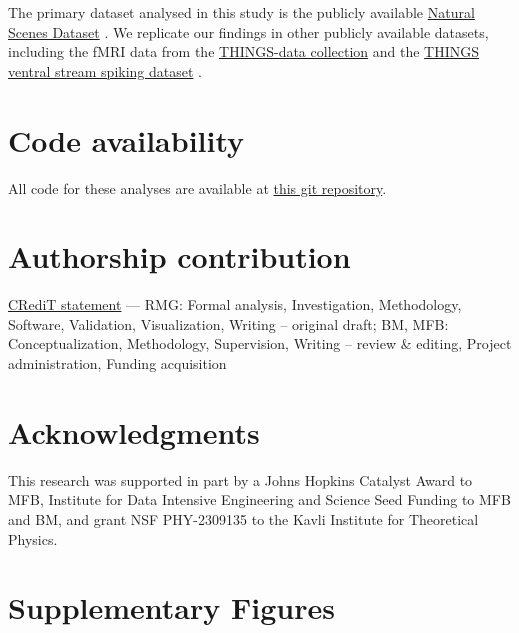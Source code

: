 \documentclass[10pt]{article}
\begin{document}
The primary dataset analysed in this study is the publicly available \href{http://naturalscenesdataset.org/}{Natural Scenes Dataset} \autocite{Allen2021}. We replicate our findings in other publicly available datasets, including the fMRI data from the \href{https://plus.figshare.com/collections/THINGS-data_A_multimodal_collection_of_large-scale_datasets_for_investigating_object_representations_in_brain_and_behavior/6161151}{THINGS-data collection} \autocite{Hebart2023} and the \href{https://gin.g-node.org/paolo_papale/TVSD/}{THINGS ventral stream spiking dataset} \autocite{Papale2025}.

\section{Code availability}\label{code-availability}

All code for these analyses are available at \href{https://github.com/BonnerLab/scale-free-visual-cortex}{this git repository}.

\section{Authorship contribution}\label{authorship-contribution}

\href{https://credit.niso.org/}{CRediT statement} --- RMG: Formal analysis, Investigation, Methodology, Software, Validation, Visualization, Writing -- original draft; BM, MFB: Conceptualization, Methodology, Supervision, Writing -- review \& editing, Project administration, Funding acquisition

\section{Acknowledgments}\label{acknowledgments}

This research was supported in part by a Johns Hopkins Catalyst Award to MFB, Institute for Data Intensive Engineering and Science Seed Funding to MFB and BM, and grant NSF PHY-2309135 to the Kavli Institute for Theoretical Physics.

\newpage
\printbibliography

\newpage
\setcounter{figure}{0}
\renewcommand{\thefigure}{S\arabic{figure}}

\section*{Supplementary Figures}\label{supplementary-figures}
\end{document}
